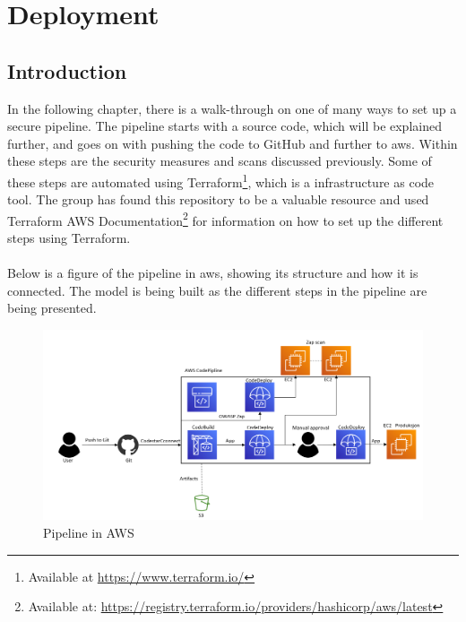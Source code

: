 \chapter{Deployment}
\label{Deployment}
\section{Introduction}
In the following chapter, there is a walk-through on one of many ways to set up a secure pipeline. The pipeline starts with a source code, which will be explained further, and goes on with pushing the code to GitHub and further to \acrshort{aws}. Within these steps are the security measures and scans discussed previously. Some of these steps are automated using Terraform\footnote{Available at \url{https://www.terraform.io/}}, which is a \gls{infrastructure as code} tool. The group has found this repository to be a valuable resource \cite{aws-cicd-pipeline} and used Terraform AWS Documentation\footnote{Available at: \url{https://registry.terraform.io/providers/hashicorp/aws/latest}} for information on how to set up the different steps using Terraform. 
\\~\\
Below is a figure of the pipeline in \acrshort{aws}, showing its structure and how it is connected. The model is being built as the different steps in the pipeline are being presented.
\vspace{2mm}
\begin{figure}[H]
    \centering
    \includegraphics[width=1\columnwidth]{Images/aws-piplin-7.png}
    \caption{Pipeline in AWS}
    \label{fig: Pipeline in AWS}
\end{figure}

